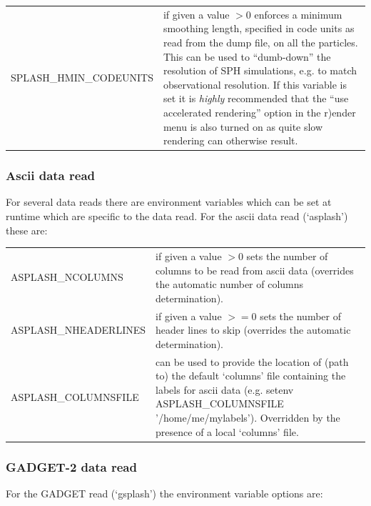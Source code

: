\documentclass[a4paper,10pt]{article}
\begin{document}
\begin{tabular}{p{}p{}}
SPLASH\_HMIN\_CODEUNITS & if given a value $>$0 enforces a minimum smoothing length, specified in code units as read from the dump file, on all the particles. This can be used to ``dumb-down'' the resolution of SPH simulations, e.g. to match observational resolution. If this variable is set it is \emph{highly} recommended that the ``use accelerated rendering'' option in the r)ender menu is also turned on as quite slow rendering can otherwise result. \\
\end{tabular}

\subsubsection{ Ascii data read}
\label{sec:asplash}
 For several data reads there are environment variables which can be set at runtime which are specific to the data read. For the
 ascii data read (`asplash') these are:\newline

\begin{tabular}{p{}p{}}
ASPLASH\_NCOLUMNS & if given a value $>$0 sets the number of columns to be read from ascii data (overrides the automatic number of
columns determination). \\
ASPLASH\_NHEADERLINES & if given a value $>=$0 sets the number of header lines to skip (overrides the automatic determination). \\
ASPLASH\_COLUMNSFILE & can be used to provide the location of (path to) the default `columns' file containing the labels for ascii data (e.g. setenv ASPLASH\_COLUMNSFILE '/home/me/mylabels'). Overridden by the presence of a local `columns' file. \\

\end{tabular}

\subsubsection{ GADGET-2 data read}
\label{sec:gsplash}
 For the GADGET read (`gsplash') the environment variable options are:\newline
\end{document}
